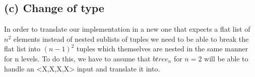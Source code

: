 \documentclass[a4paper,10pt]{article}
\begin{document}
\subsection*{(c) Change of type}
In order to translate our implementation in a new one that expects a flat list of $n^2$ elements instead of nested sublists of tuples
we need to be able to break the flat list into $(n-1)^2$ tuples which themselves are nested in the same manner for n levels. To do this, we have to assume that
$btree_n$ for $n=2$ will be able to handle an <X,X,X,X> input and translate it into.
\end{document}
